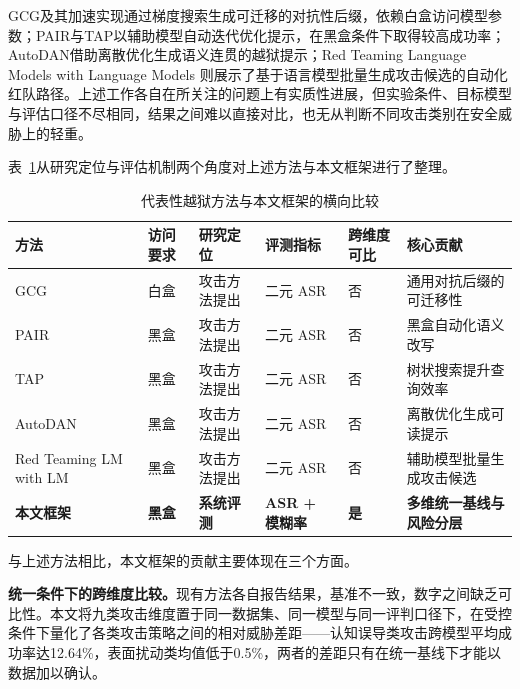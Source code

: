 GCG及其加速实现\cite{zhao2024accelerating}通过梯度搜索生成可迁移的对抗性后缀，依赖白盒访问模型参数；PAIR\cite{chao2024pair}与TAP\cite{mehrotra2024tap}以辅助模型自动迭代优化提示，在黑盒条件下取得较高成功率；AutoDAN\cite{liu2023autodan}借助离散优化生成语义连贯的越狱提示；Red Teaming Language Models with Language Models\cite{perez2022redteaming} 则展示了基于语言模型批量生成攻击候选的自动化红队路径。上述工作各自在所关注的问题上有实质性进展，但实验条件、目标模型与评估口径不尽相同，结果之间难以直接对比，也无从判断不同攻击类别在安全威胁上的轻重。

表~\ref{tab:attack-comparison}从研究定位与评估机制两个角度对上述方法与本文框架进行了整理。

\begin{table}[H]
\centering
\footnotesize
\setlength{\tabcolsep}{4pt}
\renewcommand{\arraystretch}{1.1}
\caption{代表性越狱方法与本文框架的横向比较}
\label{tab:attack-comparison}
\begin{tabular}{p{}p{}p{}p{}p{}p{}}
\toprule
\textbf{方法} & \textbf{访问要求} & \textbf{研究定位} & \textbf{评测指标} & \textbf{跨维度可比} & \textbf{核心贡献} \\
\midrule
GCG\cite{zhao2024accelerating}       & 白盒 & 攻击方法提出 & 二元 ASR & 否 & 通用对抗后缀的可迁移性 \\
PAIR\cite{chao2024pair}          & 黑盒 & 攻击方法提出 & 二元 ASR & 否 & 黑盒自动化语义改写 \\
TAP\cite{mehrotra2024tap}        & 黑盒 & 攻击方法提出 & 二元 ASR & 否 & 树状搜索提升查询效率 \\
AutoDAN\cite{liu2023autodan}     & 黑盒 & 攻击方法提出 & 二元 ASR & 否 & 离散优化生成可读提示 \\
Red Teaming LM with LM\cite{perez2022redteaming} & 黑盒 & 攻击方法提出 & 二元 ASR & 否 & 辅助模型批量生成攻击候选 \\
\textbf{本文框架} & \textbf{黑盒} & \textbf{系统评测} & \textbf{ASR + 模糊率} & \textbf{是} & \textbf{多维统一基线与风险分层} \\
\bottomrule
\end{tabular}
\end{table}

与上述方法相比，本文框架的贡献主要体现在三个方面。

\textbf{统一条件下的跨维度比较。}现有方法各自报告结果，基准不一致，数字之间缺乏可比性。本文将九类攻击维度置于同一数据集、同一模型与同一评判口径下，在受控条件下量化了各类攻击策略之间的相对威胁差距——认知误导类攻击跨模型平均成功率达12.64\%，表面扰动类均值低于0.5\%，两者的差距只有在统一基线下才能以数据加以确认。

